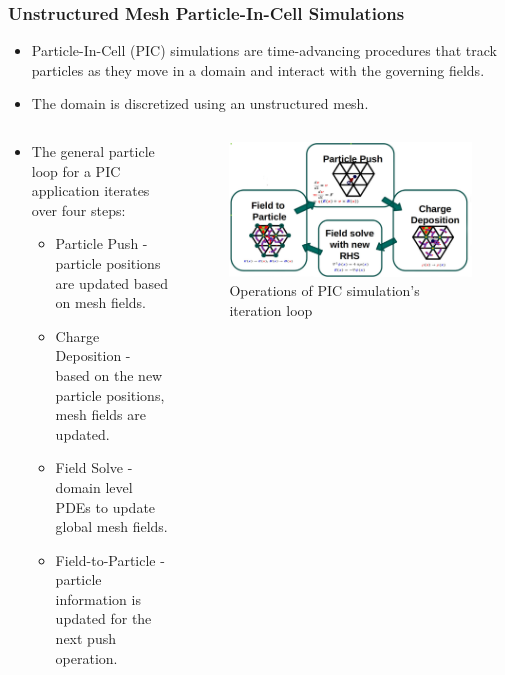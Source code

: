 \documentclass[aspectratio=169]{beamer}
\begin{document}
\begin{frame}
  \frametitle{Unstructured Mesh Particle-In-Cell Simulations}
  \begin{itemize}
  \item Particle-In-Cell (PIC) simulations are time-advancing procedures that track particles as they move in a domain and interact with the governing fields.
  \item The domain is discretized using an unstructured mesh.
  \end{itemize}
  \begin{columns}
    \begin{column}{.6\linewidth}
      \begin{itemize}
      \item The general particle loop for a PIC application iterates over four steps:
        \begin{itemize}
        \item Particle Push - particle positions are updated based on mesh fields.
        \item Charge Deposition - based on the new particle positions, mesh fields are updated.
        \item Field Solve - domain level PDEs to update global mesh fields.
        \item Field-to-Particle - particle information is updated for the next push operation.
        \end{itemize}
      \end{itemize}
    \end{column}
    \begin{column}{.4\linewidth}
      \begin{figure}
        \centering
        \includegraphics[width=.75\textwidth]{pic_loop.jpg}
        \caption*{Operations of PIC simulation's iteration loop}
      \end{figure}
    \end{column}
  \end{columns}
\end{frame}
\end{document}
